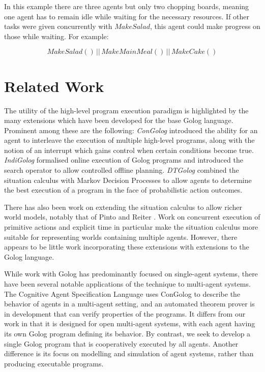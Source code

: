 \documentclass[letterpaper]{article}
\begin{document}
In this example there are three agents but only two chopping boards,
meaning one agent has to remain idle while waiting for the necessary
resources. If other tasks were given concurrently with $MakeSalad$,
this agent could make progress on those while waiting. For example:

\[
MakeSalad()\,||\, MakeMainMeal()\,||\, MakeCake()\]


\section{Related Work}

\label{sec:Other-Work}

The utility of the high-level program execution paradigm is highlighted
by the many extensions which have been developed for the base Golog
language. Prominent among these are the following: \emph{ConGolog}
\cite{giacomo00congolog} introduced the ability for an agent to interleave
the execution of multiple high-level programs, along with the notion
of an interrupt which gains control when certain conditions become
true. \emph{IndiGolog} \cite{giacomo99indigolog} formalised online
execution of Golog programs and introduced the search operator to
allow controlled offline planning. \emph{DTGolog} \cite{boutilier00dtgolog}
combined the situation calculus with Markov Decision Processes to
allow agents to determine the best execution of a program in the face
of probabilistic action outcomes.

There has also been work on extending the situation calculus to allow
richer world models, notably that of Pinto \cite{pinto94temporal}
and Reiter \cite{reiter96sc_nat_conc}. Work on concurrent execution
of primitive actions and explicit time in particular make the situation
calculus more suitable for representing worlds containing multiple
agents. However, there appears to be little work incorporating these
extensions with extensions to the Golog language.

While work with Golog has predominantly focused on single-agent systems,
there have been several notable applications of the technique to multi-agent
systems. The Cognitive Agent Specification Language \cite{shapiro02}
uses ConGolog to describe the behavior of agents in a multi-agent
setting, and an automated theorem prover is in development that can
verify properties of the programs. It differs from our work in that
it is designed for open multi-agent systems, with each agent having
its own Golog program defining its behavior. By contrast, we seek
to develop a single Golog program that is cooperatively executed by
all agents. Another difference is its focus on modelling and simulation
of agent systems, rather than producing executable programs.
\end{document}

